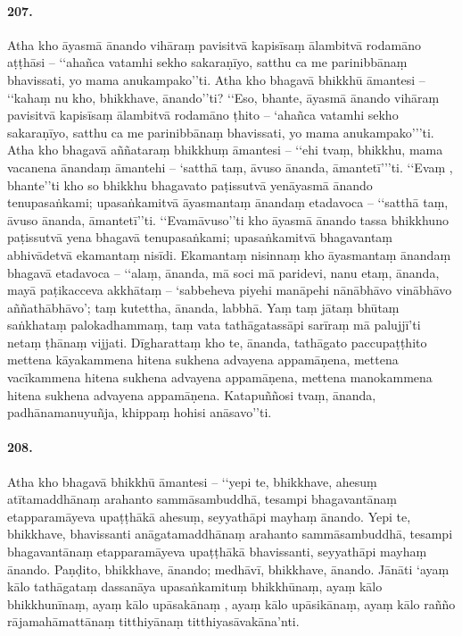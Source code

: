 \paragraph{207.} Atha kho āyasmā ānando vihāraṃ pavisitvā kapisīsaṃ ālambitvā rodamāno aṭṭhāsi – ‘‘ahañca vatamhi sekho sakaraṇīyo, satthu ca me parinibbānaṃ bhavissati, yo mama anukampako’’ti. Atha kho bhagavā bhikkhū āmantesi – ‘‘kahaṃ nu kho, bhikkhave, ānando’’ti? ‘‘Eso, bhante, āyasmā ānando vihāraṃ pavisitvā kapisīsaṃ ālambitvā rodamāno ṭhito – ‘ahañca vatamhi sekho sakaraṇīyo, satthu ca me parinibbānaṃ bhavissati, yo mama anukampako’’’ti. Atha kho bhagavā aññataraṃ bhikkhuṃ āmantesi – ‘‘ehi tvaṃ, bhikkhu, mama vacanena ānandaṃ āmantehi – ‘satthā taṃ, āvuso ānanda, āmantetī’’’ti. ‘‘Evaṃ , bhante’’ti kho so bhikkhu bhagavato paṭissutvā yenāyasmā ānando tenupasaṅkami; upasaṅkamitvā āyasmantaṃ ānandaṃ etadavoca – ‘‘satthā taṃ, āvuso ānanda, āmantetī’’ti. ‘‘Evamāvuso’’ti kho āyasmā ānando tassa bhikkhuno paṭissutvā yena bhagavā tenupasaṅkami; upasaṅkamitvā bhagavantaṃ abhivādetvā ekamantaṃ nisīdi. Ekamantaṃ nisinnaṃ kho āyasmantaṃ ānandaṃ bhagavā etadavoca – ‘‘alaṃ, ānanda, mā soci mā paridevi, nanu etaṃ, ānanda, mayā paṭikacceva akkhātaṃ – ‘sabbeheva piyehi manāpehi nānābhāvo vinābhāvo aññathābhāvo’; taṃ kutettha, ānanda, labbhā. Yaṃ taṃ jātaṃ bhūtaṃ saṅkhataṃ palokadhammaṃ, taṃ vata tathāgatassāpi sarīraṃ mā palujjī’ti netaṃ ṭhānaṃ vijjati. Dīgharattaṃ kho te, ānanda, tathāgato paccupaṭṭhito mettena kāyakammena hitena sukhena advayena appamāṇena, mettena vacīkammena hitena sukhena advayena appamāṇena, mettena manokammena hitena sukhena advayena appamāṇena. Katapuññosi tvaṃ, ānanda, padhānamanuyuñja, khippaṃ hohisi anāsavo’’ti.

\paragraph{208.} Atha kho bhagavā bhikkhū āmantesi – ‘‘yepi te, bhikkhave, ahesuṃ atītamaddhānaṃ arahanto sammāsambuddhā, tesampi bhagavantānaṃ etapparamāyeva upaṭṭhākā ahesuṃ, seyyathāpi mayhaṃ ānando. Yepi te, bhikkhave, bhavissanti anāgatamaddhānaṃ arahanto sammāsambuddhā, tesampi bhagavantānaṃ etapparamāyeva upaṭṭhākā bhavissanti, seyyathāpi mayhaṃ ānando. Paṇḍito, bhikkhave, ānando; medhāvī, bhikkhave, ānando. Jānāti ‘ayaṃ kālo tathāgataṃ dassanāya upasaṅkamituṃ bhikkhūnaṃ, ayaṃ kālo bhikkhunīnaṃ, ayaṃ kālo upāsakānaṃ , ayaṃ kālo upāsikānaṃ, ayaṃ kālo rañño rājamahāmattānaṃ titthiyānaṃ titthiyasāvakāna’nti.

